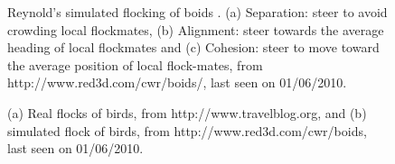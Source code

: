                                                                                                                                                                                                                                                                                                                                                                                                                                                                                                                                                                                                                                                                                                                                                                                                                                                                                                                                                                                                                                                                         \begin{figure}
\centering
{} 
\hspace{0.25cm}
\hspace{0.25cm}
\caption{ Reynold's simulated flocking of boids \protect{}. (a) Separation: steer to avoid crowding local flockmates,  (b) Alignment: steer towards the average heading of local flockmates and (c) Cohesion: steer to move toward the average position of local flock-mates,  from http://www.red3d.com/cwr/boids/, last seen on 01/06/2010.}
\label{fig:boid-rules}
\end{figure}
\begin{figure}
\centering
{} 
\hspace{0.25cm}
\caption{  (a) Real flocks of birds,  from http://www.travelblog.org, and  (b) simulated flock of birds, from http://www.red3d.com/cwr/boids, last seen on 01/06/2010.}
\label{fig:birds-flocking}
\end{figure}
